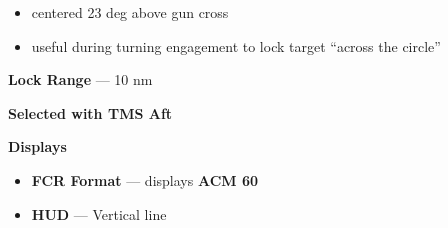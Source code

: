 \begin{tcoloritemize}
{\begin{subitemize}
        \begin{itemize}
            \item centered 23 deg above gun cross
            \item useful during turning engagement to lock target ``across the circle''
        \end{itemize}
        \item \textbf{Lock Range} --- 10 nm
        \item \textbf{Selected with TMS Aft}
        \item \textbf{Displays}
        \begin{itemize}
            \item \textbf{FCR Format} --- displays \textbf{ACM 60}
            \item \textbf{HUD} --- Vertical line
        \end{itemize}
    \end{subitemize}}
\end{tcoloritemize}

\marginfigeometry

